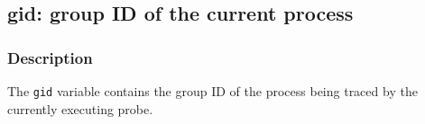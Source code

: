 \clearpage
{}
{}
\label{vars:gid}
\subsection*{gid: group ID of the current process}

\subsubsection*{Description}

The \verb|gid| variable contains the group ID of the process being
traced by the currently executing probe.


